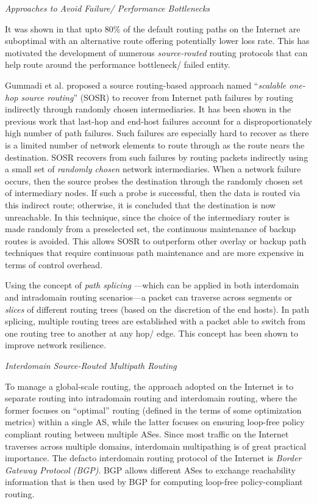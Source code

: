 \documentclass[10pt]{IEEEtran}
\begin{document}
\vspace{2mm}
\textit{Approaches to Avoid Failure/ Performance Bottlenecks}
\vspace{2mm}

It was shown in \cite{savage1999end} that upto 80\% of the default routing paths on the Internet are suboptimal with an alternative route offering potentially lower loss rate. This has motivated the development of numerous \textit{source-routed} routing protocols that can help route around the performance bottleneck/ failed entity.

Gummadi et al. \cite{gummadi2004improving} proposed a source routing-based approach named ``\textit{scalable one-hop source routing}'' (SOSR) to recover from Internet path failures by routing indirectly through randomly chosen intermediaries. It has been shown in the previous work that last-hop and end-host failures account for a disproportionately high number of path failures. Such failures are especially hard to recover as there is a limited number of network elements to route through as the route nears the destination. SOSR recovers from such failures by routing packets indirectly using a small set of \textit{randomly chosen} network intermediaries. When a network failure occurs, then the source probes the destination through the randomly chosen set of intermediary nodes. If such a probe is successful, then the data is routed via this indirect route; otherwise, it is concluded that the destination is now unreachable. In this technique, since the choice of the intermediary router is made randomly from a preselected set, the continuous maintenance of backup routes is avoided. This allows SOSR to outperform other overlay or backup path techniques that require continuous path maintenance and are more expensive in terms of control overhead.

Using the concept of \emph{path splicing} \cite{motiwala2008path}---which can be applied in both interdomain and intradomain routing scenarios---a packet can traverse across segments or \textit{slices} of different routing trees (based on the discretion of the end hosts). In path splicing, multiple routing trees are established with a packet able to switch from one routing tree to another at any hop/ edge. This concept has been shown to improve network resilience.

\vspace{2mm}
\textit{Interdomain Source-Routed Multipath Routing}
\vspace{2mm}

To manage a global-scale routing, the approach adopted on the Internet is to separate routing into intradomain routing and interdomain routing, where the former focuses on ``optimal'' routing (defined in the terms of some optimization metrics) within a single AS, while the latter focuses on ensuring loop-free policy compliant routing between multiple ASes. Since most traffic on the Internet traverses across multiple domains, interdomain multipathing is of great practical importance. The defacto interdomain routing protocol of the Internet is \textit{Border Gateway Protocol (BGP)}. BGP allows different ASes to exchange reachability information that is then used by BGP for computing loop-free policy-compliant routing. 
\end{document}
